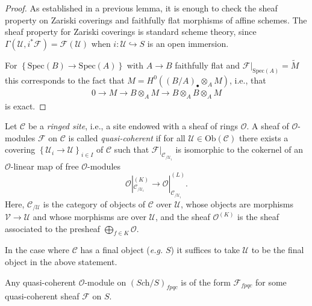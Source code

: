\begin{proof}
As established in a previous lemma, it is enough to check the sheaf property
on Zariski coverings and faithfully flat morphisms of affine schemes. The
sheaf property for Zariski coverings is standard scheme theory, since
$\Gamma(\mathcal{U}, i^\ast \mathcal{F}) = \mathcal{F}(\mathcal{U})$ when $i:
\mathcal{U} \hookrightarrow S$ is an open immersion.

\medskip\noindent
For $\left\{\text{Spec}(B)\to \text{Spec}(A)\right\}$ with $A\to B$ faithfully
flat and
$\mathcal{F}|_{\text{Spec}(A)} = \widetilde{M}$
this corresponds to the fact that
$M = H^0\left((B/A)_\bullet\otimes_AM \right)$, i.e., that
\begin{align*}
0 \to M \to B\otimes_A M \to B\otimes_A B \otimes_A M
\end{align*}
is exact.
\end{proof}

\begin{definition}
\label{definition-ringed-site}
Let $\mathcal{C}$ be a {\it ringed site}, i.e., a site endowed with a
sheaf of rings $\mathcal{O}$. A sheaf of $\mathcal{O}$-modules $\mathcal{F}$ on
$\mathcal{C}$ is called {\it quasi-coherent} if for all $\mathcal{U}\in
\text{Ob}(\mathcal{C})$ there exists a covering $\left\{\mathcal{U}_i \to
\mathcal{U}\right\}_{i\in I}$ of $\mathcal{C}$ such that
$\mathcal{F}|_{\mathcal{C}_{/\mathcal{U}_i}}$ is isomorphic to the cokernel of
an $\mathcal{O}$-linear map of free $\mathcal{O}$-modules
$$
\mathcal{O}|_{\mathcal{C}_{/\mathcal{U}_i}}^{(K)} \to
\mathcal{O}|_{\mathcal{C}_{/\mathcal{U}_i}}^{(L)}.
$$
Here, $\mathcal{C}_{/\mathcal{U}}$ is the category of objects of
$\mathcal{C}$ over $\mathcal{U}$, whose objects are morphisms
$\mathcal{V} \to \mathcal{U}$ and whose morphisms are over $\mathcal{U}$,
and the sheaf $\mathcal{O}^{(K)}$ is the sheaf associated to the
presheaf $\bigoplus_{f \in K} \mathcal{O}$.
\end{definition}

\begin{remark}
\label{remark-final-object}
In the case where $\mathcal{C}$ has a final object ({\it e.g.} $S$) it
suffices to take $\mathcal{U}$ to be the final object in the above statement.
\end{remark}

\begin{theorem}
\label{theorem-quasi-coherent}
Any quasi-coherent $\mathcal{O}$-module on $(\textit{Sch}/S)_{fpqc}$
is of the form $\mathcal{F}_{fpqc}$ for some quasi-coherent sheaf
$\mathcal{F}$ on $S$.
\end{theorem}

